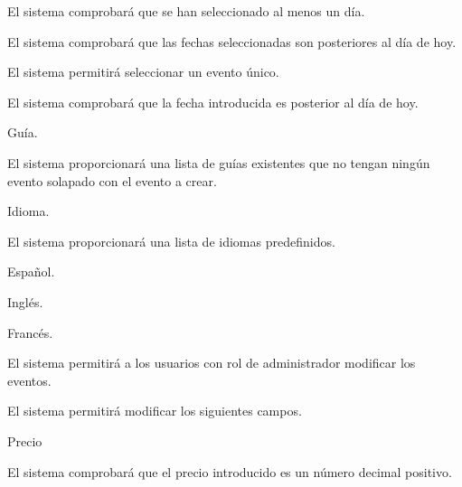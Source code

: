 \begin{enumitem}[label=\bfseries{RAdm \arabic*.},leftmargin=*]
\begin{enumitem}[label*=\bfseries{\arabic*.}]
\begin{enumitem}[label*=\bfseries{\arabic*.}]
\begin{enumitem}[label*=\bfseries{\arabic*.}]
\begin{enumitem}[label*=\bfseries{\arabic*.}]
					\begin{enumitem}[label*=\bfseries{\arabic*.}]
						\item El sistema comprobará que se han seleccionado al menos un día.
						\item El sistema comprobará que las fechas seleccionadas son posteriores al día de hoy.
					\end{enumitem}
				\end{enumitem}
				\item El sistema permitirá seleccionar un evento único.
				\begin{enumitem}[label*=\bfseries{\arabic*.}]
					\item El sistema comprobará que la fecha introducida es posterior al día de hoy.
				\end{enumitem}
			\end{enumitem}
			\item Guía.
			\begin{enumitem}[label*=\bfseries{\arabic*.}]
				\item El sistema proporcionará una lista de guías existentes que no tengan ningún evento solapado con el evento a crear.
			\end{enumitem}
			\item Idioma.
			\begin{enumitem}[label*=\bfseries{\arabic*.}]
				\item El sistema proporcionará una lista de idiomas predefinidos.
				\begin{enumitem}[label*=\bfseries{\arabic*.}]
					\item Español.
					\item Inglés.
					\item Francés.
				\end{enumitem}
			\end{enumitem}
		\end{enumitem}
	\end{enumitem}
	\item El sistema permitirá a los usuarios con rol de administrador modificar los eventos.
	\begin{enumitem}[label*=\bfseries{\arabic*.}]
		\item El sistema permitirá modificar los siguientes campos.
		\begin{enumitem}[label*=\bfseries{\arabic*.}]
			\item Precio
			\begin{enumitem}[label*=\bfseries{\arabic*.}]
				\item El sistema comprobará que el precio introducido es un número decimal positivo.

\end{enumitem}
\end{enumitem}
\end{enumitem}
\end{enumitem}
